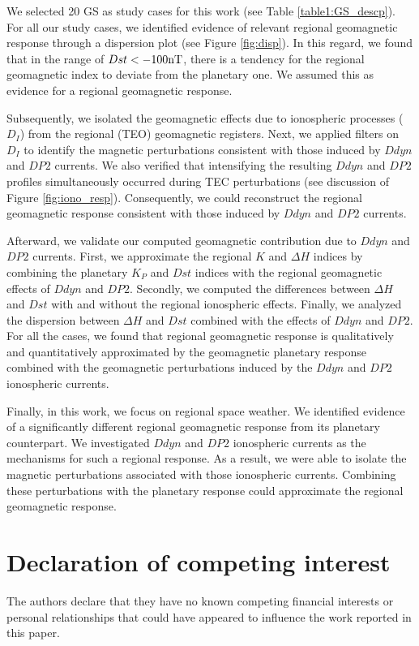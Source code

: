 \documentclass[a4paper,fleqn]{cas-dc}
\begin{document}
We selected 20 GS as study cases for this work (see Table \ref{table1:GS_descp}). For all our study cases, we identified evidence of relevant regional geomagnetic response through a dispersion plot (see Figure \ref{fig:disp}). In this regard, we found that in the range of $Dst < -100 {\rm nT}$, there is a tendency for the regional geomagnetic index to deviate from the planetary one. We assumed this as evidence for a regional geomagnetic response.

Subsequently, we isolated the geomagnetic effects due to ionospheric processes ($D_I$) from the regional (TEO) geomagnetic registers. Next, we applied filters on $D_I$ to identify the magnetic perturbations consistent with those induced by $Ddyn$ and $DP2$ currents. We also verified that intensifying the resulting $Ddyn$ and $DP2$ profiles simultaneously occurred during TEC perturbations (see discussion of Figure \ref{fig:iono_resp}). Consequently, we could reconstruct the regional geomagnetic response consistent with those induced by $Ddyn$ and $DP2$ currents.

Afterward, we validate our computed geomagnetic contribution due to $Ddyn$ and $DP2$ currents. First, we approximate the regional $K$ and $\Delta H$ indices by combining the planetary $K_P$ and $Dst$ indices with the regional geomagnetic effects of $Ddyn$ and $DP2$. Secondly, we computed the differences between $\Delta H$ and $Dst$ with and without the regional ionospheric effects. Finally, we analyzed the dispersion between $\Delta H$ and $Dst$ combined with the effects of $Ddyn$ and $DP2$. For all the cases, we found that regional geomagnetic response is qualitatively and quantitatively approximated by the geomagnetic planetary response combined with the geomagnetic perturbations induced by the $Ddyn$ and $DP2$ ionospheric currents. 

Finally, in this work, we focus on regional space weather. We identified evidence of a significantly different regional geomagnetic response from its planetary counterpart. We investigated $Ddyn$ and $DP2$ ionospheric currents as the mechanisms for such a regional response. As a result, we were able to isolate the magnetic perturbations associated with those ionospheric currents. Combining these perturbations with the planetary response could approximate the regional geomagnetic response.


\printcredits
\section*{Declaration of competing interest}
\label{Declaration}
The authors declare that they have no known competing financial interests or personal relationships that could have appeared to
influence the work reported in this paper.
\end{document}

